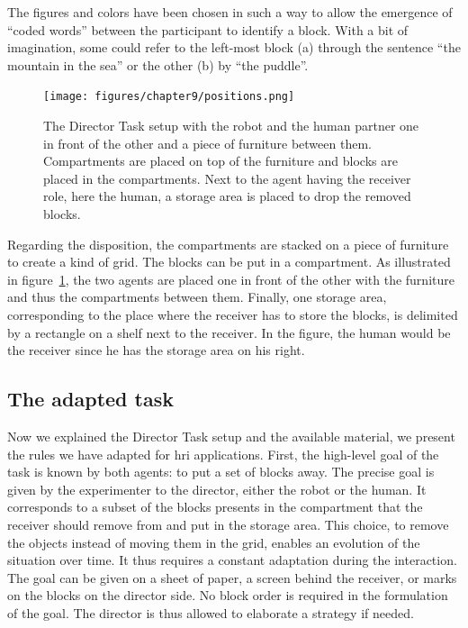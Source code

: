 The figures and colors have been chosen in such a way to allow the emergence of ``coded words'' between the participant to identify a block. With a bit of imagination, some could refer to the left-most block (a) through the sentence ``the mountain in the sea'' or the other (b) by ``the puddle''.

\begin{figure}[ht!]
\centering
\texttt{[image: figures/chapter9/positions.png]}
\caption{\label{fig:chap9_positions} The Director Task setup with the robot and the human partner one in front of the other and a piece of furniture between them. Compartments are placed on top of the furniture and blocks are placed in the compartments. Next to the agent having the receiver role, here the human, a storage area is placed to drop the removed blocks. }
\end{figure}

Regarding the disposition, the compartments are stacked on a piece of furniture to create a kind of grid. The blocks can be put in a compartment. As illustrated in figure~\ref{fig:chap9_positions}, the two agents are placed one in front of the other with the furniture and thus the compartments between them. Finally, one storage area, corresponding to the place where the receiver has to store the blocks, is delimited by a rectangle on a shelf next to the receiver. In the figure, the human would be the receiver since he has the storage area on his right.

\subsection{The adapted task}

Now we explained the Director Task setup and the available material, we present the rules we have adapted for \acrshort{hri} applications. First, the high-level goal of the task is known by both agents: to put a set of blocks away. The precise goal is given by the experimenter to the director, either the robot or the human. It corresponds to a subset of the blocks presents in the compartment that the receiver should remove from and put in the storage area. This choice, to remove the objects instead of moving them in the grid, enables an evolution of the situation over time. It thus requires a constant adaptation during the interaction. The goal can be given on a sheet of paper, a screen behind the receiver, or marks on the blocks on the director side. No block order is required in the formulation of the goal. The director is thus allowed to elaborate a strategy if needed.


